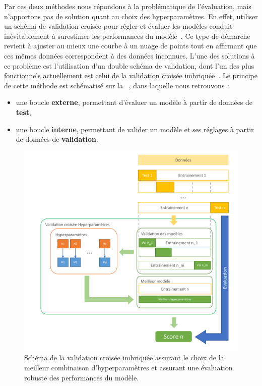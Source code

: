 Par ces deux méthodes nous répondons à la problématique de l'évaluation, mais n'apportons pas de solution quant au choix des hyperparamètres. En effet, utiliser un schéma de validation croisée pour régler et évaluer les modèles conduit inévitablement à surestimer les performances du modèle~\cite{Tsamardinos2014}. Ce type de démarche revient à ajuster au mieux une courbe à un nuage de points tout en affirmant que ces mêmes données correspondent à des données inconnues. L'une des solutions à ce problème est l'utilisation d'un double schéma de validation, dont l'un des plus fonctionnels actuellement est celui de la validation croisée imbriquée~\cite{Cawley2010}. Le principe de cette méthode est schématisé sur la ~, dans laquelle nous retrouvons~:
\begin{itemize}
    \item une boucle \textbf{externe}, permettant d'évaluer un modèle à partir de données de \textbf{test},
    \item une boucle \textbf{interne}, permettant de valider un modèle et ses réglages à partir de données de \textbf{validation}.
\end{itemize}\par
  
\begin{figure}[H]
    \centering
    \includegraphics[width=\linewidth]{contents/chapter_3/resources/scheme_hyperparameter_process.pdf}
    \caption{Schéma de la validation croisée imbriquée assurant le choix de la meilleur combinaison d'hyperparamètres et assurant une évaluation robuste des performances du modèle.}
    \label{fig:scheme_hyperparameter_process}
\end{figure}\par

